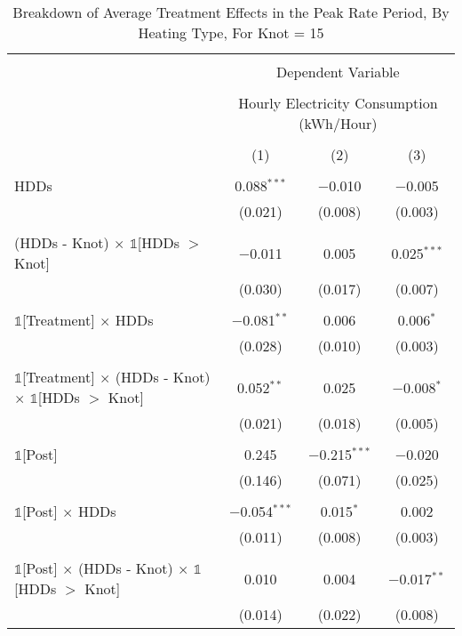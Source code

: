 
\begin{table}[!htbp] \centering 
  \caption{Breakdown of Average Treatment Effects in the Peak Rate Period, By Heating Type, For Knot = 15} 
  \label{Table:Breakdown-of-Average-Treatment-Effects-in-the-Peak-Rate-Period_By-Heating-Type_Knot-15} 
\small 
\begin{tabular}{@{\extracolsep{20pt}}lccc} 
\\[-1.8ex]\hline 
\hline \\[-1.8ex] 
 & \multicolumn{3}{c}{Dependent Variable} \\ 
\cline{2-4} 
\\[-1.8ex] & \multicolumn{3}{c}{Hourly Electricity Consumption  (kWh/Hour)} \\ 
\\[-1.8ex] & (1) & (2) & (3)\\ 
\hline \\[-1.8ex] 
 HDDs & 0.088$^{***}$ & $-$0.010 & $-$0.005 \\ 
  & (0.021) & (0.008) & (0.003) \\ 
  & & & \\ 
 (HDDs - Knot) $\times$ $\mathbb{1}$[HDDs $>$ Knot] & $-$0.011 & 0.005 & 0.025$^{***}$ \\ 
  & (0.030) & (0.017) & (0.007) \\ 
  & & & \\ 
 $\mathbb{1}$[Treatment] $\times$ HDDs & $-$0.081$^{**}$ & 0.006 & 0.006$^{*}$ \\ 
  & (0.028) & (0.010) & (0.003) \\ 
  & & & \\ 
 $\mathbb{1}$[Treatment] $\times$ (HDDs - Knot) $\times$ $\mathbb{1}$[HDDs $>$ Knot] & 0.052$^{**}$ & 0.025 & $-$0.008$^{*}$ \\ 
  & (0.021) & (0.018) & (0.005) \\ 
  & & & \\ 
 $\mathbb{1}$[Post] & 0.245 & $-$0.215$^{***}$ & $-$0.020 \\ 
  & (0.146) & (0.071) & (0.025) \\ 
  & & & \\ 
 $\mathbb{1}$[Post] $\times$ HDDs & $-$0.054$^{***}$ & 0.015$^{*}$ & 0.002 \\ 
  & (0.011) & (0.008) & (0.003) \\ 
  & & & \\ 
 $\mathbb{1}$[Post] $\times$ (HDDs - Knot) $\times$ $\mathbb{1}$[HDDs $>$ Knot] & 0.010 & 0.004 & $-$0.017$^{**}$ \\ 
  & (0.014) & (0.022) & (0.008) \\ 

\end{tabular}
\end{table}
